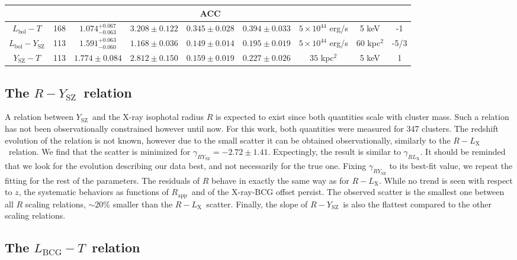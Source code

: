 \documentclass{aa}   %
\newcommand{\YT}{$Y_{\text{SZ}}-T$}
\newcommand{\LbcgT}{$L_{\text{BCG}}-T$}
\newcommand{\RL}{$R-L_{\text{X}}$}
\newcommand{\RY}{$R-Y_{\text{SZ}}$}
\newcommand{\Ysz}{$Y_{\text{SZ}}$}
\newcommand{\Rapp}{$R_{\text{app}}$}
\begin{document}
\begin{table}[hbtp]
\begin{center}
\begin{tabular}{ c  c  c  c  c  c | c  c c}
& & & & ACC & & & & \\ \hline
$L_{\text{bol}}-T$ & 168 & $1.074^{+0.067}_{-0.063}$ & $3.208\pm 0.122$ & $0.345\pm 0.028$ & $0.394\pm 0.033$ & $5\times 10^{44}$ erg/s & 5 keV & -1 \\ 
$L_{\text{bol}}-Y_{\text{SZ}}$ & 113 & $1.591^{+0.063}_{-0.060}$ & $1.168\pm 0.036$ & $0.149\pm 0.014$ & $0.195\pm 0.019$ & $5\times 10^{44}$ erg/s & 60 kpc$^2$ & -5/3 \\ 
\YT & 113 & $1.774\pm 0.084$ & $2.812\pm 0.150 $ & $0.159\pm 0.019$ & $0.227\pm 0.026$ & $35$ kpc$^2$& 5 keV & 1\\ 



 \hline
 

\end{tabular}
\end{center}
\end{table}

\subsection{The \RY\ relation}

A relation between \Ysz\ and the X-ray isophotal radius $R$ is expected to exist since both quantities scale with cluster mass. Such a relation has not been observationally constrained however until now. For this work, both quantities were measured for 347 clusters. The redshift evolution of the relation is not known, however due to the small scatter it can be obtained observationally, similarly to the \RL\ relation. We find that the scatter is minimized for  $\gamma_{RY_{\text{SZ}}}=-2.72\pm 1.41$. Expectingly, the result is similar to $\gamma_{RL_{\text{X}}}$. It should be reminded that we look for the evolution describing our data best, and not necessarily for the true one. Fixing $\gamma_{RY_{\text{SZ}}}$ to its best-fit value, we repeat the fitting for the rest of the parameters. The residuals of $R$ behave in exactly the same way as for \RL. While no trend is seen with respect to $z$, the systematic behaviors as functions of \Rapp\ and of the X-ray-BCG offset persist. The observed scatter is the smallest one between all $R$ scaling relations, $\sim 20\%$ smaller than the \RL\ scatter. Finally, the slope of \RY\ is also the flattest compared to the other scaling relations.

\subsection{The \LbcgT\ relation}
\end{document}
